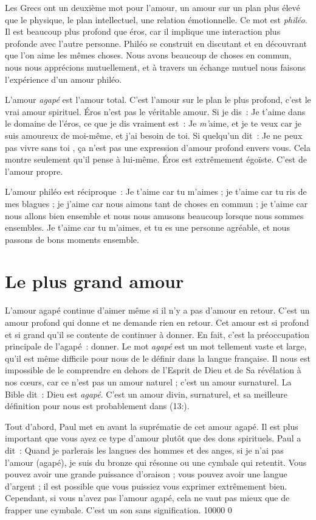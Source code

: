 Les Grecs ont un deuxième mot pour l'amour,
 un amour sur un plan plus élevé que le physique, le plan intellectuel,
 une relation émotionnelle. Ce mot est \emph{philéo}.
 Il est beaucoup plus profond que éros, car il implique une interaction
 plus profonde avec l'autre personne.
 Philéo se construit en discutant et en découvrant que l'on aime
 les mêmes choses. Nous avons beaucoup de choses en commun,
 nous nous apprécions mutuellement, et à travers un échange mutuel
 nous faisons l'expérience d'un amour philéo.

L'amour \emph{agapé} est l'amour total.
 C'est l'amour sur le plan le plus profond, c'est le vrai amour spirituel.
 Éros n'est pas le véritable amour. Si je dis~: \og Je t'aime \fg{}
 dans le domaine de l'éros, ce que je dis vraiment est~:
 \og Je \emph{m'}aime, et je te veux car je suis amoureux de moi-même,
 et j'ai besoin de toi. \fg{}
 Si quelqu'un dit~: \og Je ne peux pas vivre sans toi \fg{},
 ça n'est pas une expression d'amour profond envers vous.
 Cela montre seulement qu'il pense à lui-même.
 Éros est extrêmement égoïste. C'est de l'amour propre.

L'amour philéo est réciproque~: \og Je t'aime car tu m'aimes ;
 je t'aime car tu ris de mes blagues ;
 je j'aime car nous aimons tant de choses en commun ;
 je t'aime car nous allons bien ensemble et nous nous amusons beaucoup
 lorsque nous sommes ensembles. Je t'aime car tu m'aimes,
 et tu es une personne agréable, et nous passons de bons moments ensemble. \fg{}


\section*{Le plus grand amour}

L'amour agapé continue d'aimer même si il n'y a pas d'amour en retour.
 C'est un amour profond qui donne et ne demande rien en retour.
 Cet amour est si profond et si grand qu'il se contente
 de continuer à donner.
 En fait, c'est la préoccupation principale de l'agapé~: donner.
 Le mot \emph{agapé} est un mot tellement vaste et large,
 qu'il est même difficile pour nous de le définir dans la langue française.
 Il nous est impossible de le comprendre en dehors de l'Esprit de Dieu
 et de Sa révélation à nos cœurs, car ce n'est pas un amour naturel ;
 c'est un amour surnaturel.
 La Bible dit~: \og Dieu est \emph{agapé}. \fg{}
 C'est un amour divin, surnaturel, et sa meilleure définition pour nous
 est probablement dans (13:).

Tout d'abord, Paul met en avant la suprématie de cet amour agapé.
 Il est plus important que vous ayez ce type d'amour
 plutôt que des dons spirituels. Paul a dit~:
 \og Quand je parlerais les langues des hom\-mes et des anges,
 si je n'ai pas l'amour (agapé), je suis du bronze qui résonne
 ou une cymbale qui retentit. \fg{}
 Vous pouvez avoir une grande puissance d'oraison ;
 vous pouvez avoir une langue d'argent ;
 il est possible que vous puissiez vous exprimer extrêmement bien.
 Cependant, si vous n'avez pas l'amour agapé, cela ne vaut pas mieux
 que de frapper une cymbale. C'est un son sans signification.
 \begingroup{} 10000 0
 \par\endgroup

